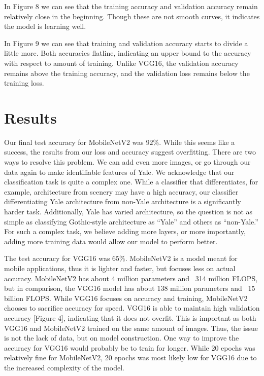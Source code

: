 \documentclass[letterpaper]{article} %
\begin{document}
In Figure 8 we can see that the training accuracy and validation accuracy remain relatively close in the beginning. Though these are not smooth curves, it indicates the model is learning well. 

In Figure 9 we can see that training and validation accuracy starts to divide a little more. Both accuracies flatline, indicating an upper bound to the accuracy with respect to amount of training. Unlike VGG16, the validation accuracy remains above the training accuracy, and the validation loss remains below the training loss. 

\section{Results}

Our final test accuracy for MobileNetV2 was $92\%$. While this seems like a success, the results from our loss and accuracy suggest overfitting. There are two ways to resolve this problem. We can add even more images, or go through our data again to make identifiable features of Yale. We acknowledge that our classification task is quite a complex one. While a classifier that differentiates, for example, architecture from scenery may have a high accuracy, our classifier differentiating Yale architecture from non-Yale architecture is a significantly harder task. Additionally, Yale has varied architecture, so the question is not as simple as classifying Gothic-style architecture as “Yale” and others as “non-Yale.” For such a complex task, we believe adding more layers, or more importantly, adding more training data would allow our model to perform better.

The test accuracy for VGG16 was $65\%$. MobileNetV2 is a model meant for mobile applications, thus it is lighter and faster, but focuses less on actual accuracy. MobileNetV2 has about 4 million parameters and ~314 million FLOPS, but in comparison, the VGG16 model has about 138 million parameters and ~15 billion FLOPS. While VGG16 focuses on accuracy and training, MobileNetV2 chooses to sacrifice accuracy for speed. VGG16 is able to maintain high validation accuracy [Figure 4], indicating that it does not overfit. This is important as both VGG16 and MobileNetV2 trained on the same amount of images. Thus, the issue is not the lack of data, but on model construction. One way to improve the accuracy for VGG16 would probably be to train for longer. While 20 epochs was relatively fine for MobileNetV2, 20 epochs was most likely low for VGG16 due to the increased complexity of the model.
\end{document}
